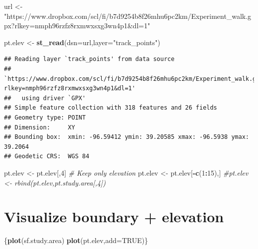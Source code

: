 \documentclass[
]{book}
\newenvironment{Shaded}{\begin{snugshade}}{\end{snugshade}}
\newcommand{\AttributeTok}[1]{\textcolor[rgb]{0.13,0.29,0.53}{#1}}
\newcommand{\CommentTok}[1]{\textcolor[rgb]{0.56,0.35,0.01}{\textit{#1}}}
\newcommand{\ConstantTok}[1]{\textcolor[rgb]{0.56,0.35,0.01}{#1}}
\newcommand{\DecValTok}[1]{\textcolor[rgb]{0.00,0.00,0.81}{#1}}
\newcommand{\FunctionTok}[1]{\textcolor[rgb]{0.13,0.29,0.53}{\textbf{#1}}}
\newcommand{\NormalTok}[1]{#1}
\newcommand{\OtherTok}[1]{\textcolor[rgb]{0.56,0.35,0.01}{#1}}
\newcommand{\SpecialCharTok}[1]{\textcolor[rgb]{0.81,0.36,0.00}{\textbf{#1}}}
\newcommand{\StringTok}[1]{\textcolor[rgb]{0.31,0.60,0.02}{#1}}
\begin{document}
\begin{Shaded}
\begin{Highlighting}[]
\NormalTok{url }\OtherTok{\textless{}{-}} \StringTok{"https://www.dropbox.com/scl/fi/b7d9254b8f26mhu6pc2km/Experiment\_walk.gpx?rlkey=nmph96rzfz8rxmwxsxg3wn4p1\&dl=1"}

\NormalTok{pt.elev }\OtherTok{\textless{}{-}} \FunctionTok{st\_read}\NormalTok{(}\AttributeTok{dsn=}\NormalTok{url,}\AttributeTok{layer=}\StringTok{"track\_points"}\NormalTok{)}
\end{Highlighting}
\end{Shaded}

\begin{verbatim}
## Reading layer `track_points' from data source 
##   `https://www.dropbox.com/scl/fi/b7d9254b8f26mhu6pc2km/Experiment_walk.gpx?rlkey=nmph96rzfz8rxmwxsxg3wn4p1&dl=1' 
##   using driver `GPX'
## Simple feature collection with 318 features and 26 fields
## Geometry type: POINT
## Dimension:     XY
## Bounding box:  xmin: -96.59412 ymin: 39.20585 xmax: -96.5938 ymax: 39.2064
## Geodetic CRS:  WGS 84
\end{verbatim}

\begin{Shaded}
\begin{Highlighting}[]
\NormalTok{pt.elev }\OtherTok{\textless{}{-}}\NormalTok{ pt.elev[,}\DecValTok{4}\NormalTok{] }\CommentTok{\# Keep only elevation}
\NormalTok{pt.elev }\OtherTok{\textless{}{-}}\NormalTok{ pt.elev[}\SpecialCharTok{{-}}\FunctionTok{c}\NormalTok{(}\DecValTok{1}\SpecialCharTok{:}\DecValTok{15}\NormalTok{),]}
\CommentTok{\#pt.elev \textless{}{-} rbind(pt.elev,pt.study.area[,4])}
\end{Highlighting}
\end{Shaded}

\hypertarget{visualize-boundary-elevation}{%
\section{Visualize boundary + elevation}\label{visualize-boundary-elevation}}

\begin{Shaded}
\begin{Highlighting}[]
\NormalTok{\{}\FunctionTok{plot}\NormalTok{(sf.study.area)}
\FunctionTok{plot}\NormalTok{(pt.elev,}\AttributeTok{add=}\ConstantTok{TRUE}\NormalTok{)\}}
\end{Highlighting}
\end{Shaded}
\end{document}
